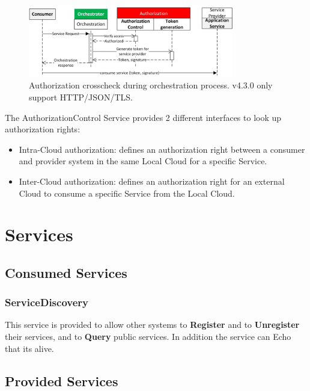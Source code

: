 \documentclass[a4paper]{arrowhead}
\newcommand{\spdef}[2]{{\textcolor{ArrowheadBlue}{#2\label{sec:services:produced:#1}}}}
\begin{document}
\begin{figure}[t!]
  \centering 
  \includegraphics[width=0.8\textwidth]{figures/authorization_crosscheck.png}
  \caption{Authorization crosscheck during orchestration process. v4.3.0 only support HTTP/JSON/TLS.}
  \label{fig:AuthSysDD}
\end{figure}

The AuthorizationControl Service provides 2 different interfaces to look up authorization rights:

\begin{itemize}
    \item Intra-Cloud authorization: defines an authorization right between a consumer and provider system in the same Local Cloud for a specific Service.
    \item Inter-Cloud authorization: defines an authorization right for an external Cloud to consume a specific Service from the Local Cloud.
\end{itemize}

\section{Services}
\label{sec:services}


\subsection{Consumed Services}

\subsubsection{\spdef{ServiceDiscovery}{ServiceDiscovery}}

This service is provided to allow other systems to \textbf{Register}
and to \textbf{Unregister} their services, and to \textbf{Query}
public services. In addition the service can Echo that its alive.

\subsection{Provided Services}
\end{document}
